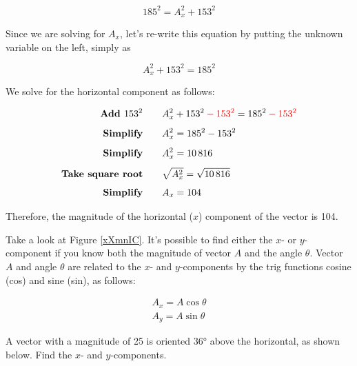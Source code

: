\documentclass[main.tex]{subfiles}
\begin{document}
\begin{equation*}
    185^2 = A_x^2 + 153^2
\end{equation*}

Since we are solving for $A_x$, let's re-write this equation by putting the unknown variable on the left, simply as 

\begin{equation*}
    A_x^2 + 153^2 = 185^2
\end{equation*}

We solve for the horizontal component as follows:

\begin{align*}
    \textbf{Add $153^2$} \qquad & A_x^2 + 153^2 \mathbin{\color{red} -} \textcolor{red}{153^2} = 185^2 \mathbin{\color{red} -} \textcolor{red}{153^2}\\[1ex]
    \textbf{Simplify} \qquad & A_x^2 = 185^2 - 153^2\\[1ex]
    \textbf{Simplify} \qquad & A_x^2 = \num{10816}\\[1ex]
    \textbf{Take square root} \qquad & \sqrt{A_x^2} = \sqrt{\num{10816}}\\[1ex]
    \textbf{Simplify} \qquad & A_x = 104
\end{align*}

Therefore, the magnitude of the horizontal ($x$) component of the vector is 104.

\endsolution

Take a look at Figure \ref{xXmnIC}. It's possible to find either the $x$- or $y$-component if you know both the magnitude of vector $A$ and the angle $\theta$. Vector $A$ and angle $\theta$ are related to the $x$- and $y$-components by the trig functions cosine (cos) and sine (sin), as follows:

\begin{align}
    A_x = A \cos{\theta} \label{06CyUc}\\[1ex]
    A_y = A \sin{\theta} \label{aBWDIc}
\end{align}

\begin{example}
    A vector with a magnitude of 25 is oriented \ang{36} above the horizontal, as shown below. Find the $x$- and $y$-components.
\end{example}

\begin{center}
\end{center}
\end{document}

